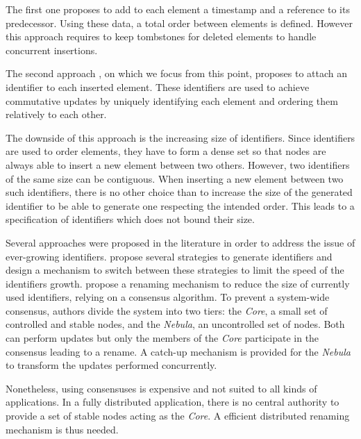 \documentclass[sigplan]{acmart}
\begin{document}
The first one \cite{briot:hal-01343941} proposes to add to each element a timestamp and a reference to its predecessor.
Using these data, a total order between elements is defined.
However this approach requires to keep tombstones for deleted elements to handle concurrent insertions.

The second approach \cite{AndreCollaborateCom2013}, on which we focus from this point, proposes to attach an identifier to each inserted element.
These identifiers are used to achieve commutative updates by uniquely identifying each element and ordering them relatively to each other.

The downside of this approach is the increasing size of identifiers.
Since identifiers are used to order elements, they have to form a dense set so that nodes are always able to insert a new element between two others.
However, two identifiers of the same size can be contiguous.
When inserting a new element between two such identifiers, there is no other choice than to increase the size of the generated identifier to be able to generate one respecting the intended order. This leads to a specification of identifiers which does not bound their size.

Several approaches were proposed in the literature in order to address the issue of ever-growing identifiers.
\citet{nedelec_2013_lseq} propose several strategies to generate identifiers and design a mechanism to switch between these strategies to limit the speed of the identifiers growth.
\citet{leia:inria-00397981} propose a renaming mechanism to reduce the size of currently used identifiers, relying on a consensus algorithm.
To prevent a system-wide consensus, authors divide the system into two tiers: the \emph{Core}, a small set of controlled and stable nodes, and the \emph{Nebula}, an uncontrolled set of nodes.
Both can perform updates but only the members of the \emph{Core} participate in the consensus leading to a rename.
A catch-up mechanism is provided for the \emph{Nebula} to transform the updates performed concurrently.

Nonetheless, using consensuses is expensive and not suited to all kinds of applications. In a fully distributed application, there is no central authority to provide a set of stable nodes acting as the \emph{Core}. A efficient distributed renaming mechanism is thus needed.
\end{document}
